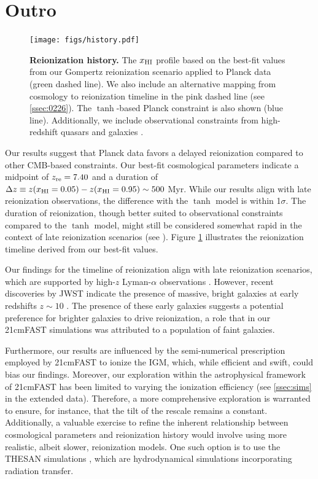 \section*{Outro}

\begin{figure}
\centering
\texttt{[image: figs/history.pdf]}
\caption{\textbf{Reionization history.}
The $x_{\mathrm{HI}}$ profile based on the best-fit values from our Gompertz
reionization scenario applied to Planck data (green dashed line).
We also include an alternative mapping from cosmology to reionization
timeline in the pink dashed line (see \ref{ssec:0226}).
The $\tanh$-based Planck constraint is also shown (blue line).
Additionally, we include observational constraints from high-redshift
quasars \cite{Greig2017, Banados2018, Davies2018, Greig2019, Wang2020,
Yang2020, Greig2022, Jin2023} and galaxies \cite{Ouchi2010,
Sobacchi2015, Mason2018, Mason2019, Hoag2019, Mesinger2015}.}
\label{fig:history}
\end{figure}

Our results suggest that Planck data favors a delayed reionization
compared to other CMB-based constraints.
Our best-fit cosmological parameters indicate a midpoint of $z_{\mathrm{re}} =
7.40$ and a duration of $\Delta z \equiv z(x_{\mathrm{HI}} = 0.05) - z(x_{\mathrm{HI}} =
0.95) \sim 500 $ Myr.
While our results align with late reionization observations, the
difference with the $\tanh$ model is within 1$\sigma$.
The duration of reionization, though better suited to observational
constraints compared to the $\tanh$ model, might still be considered
somewhat rapid in the context of late reionization scenarios (see
\cite{Cain2021}).
Figure \ref{fig:history} illustrates the reionization timeline derived
from our best-fit values.

Our findings for the timeline of reionization align with late
reionization scenarios, which are supported by high-$z$ Lyman-$\alpha$
observations \cite{Keating2020,Cain2021}.
However, recent discoveries by JWST indicate the presence of massive,
bright galaxies at early redshifts $z \sim 10$
\cite{Adams2023,Bradley2023,Donnan2023}.
The presence of these early galaxies suggests a potential  preference
for brighter galaxies to drive reionization, a role that in our 21cmFAST
simulations was attributed to a population of faint galaxies.

Furthermore, our results are influenced by the semi-numerical
prescription employed by 21cmFAST to ionize the IGM, which, while
efficient and swift, could bias our findings.
Moreover, our exploration within the astrophysical framework of 21cmFAST
has been limited to varying the ionization efficiency (see
\ref{ssec:sims} in the extended data).
Therefore, a more comprehensive exploration is warranted to ensure, for
instance, that the tilt of the rescale remains a constant.
Additionally, a valuable exercise to refine the inherent relationship
between cosmological parameters and reionization history would involve
using more realistic, albeit slower, reionization models.
One such option is to use the THESAN simulations \cite{Kannan2022},
which are hydrodynamical simulations incorporating radiation transfer.



